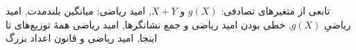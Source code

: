 \documentclass[a4paper,11pt,oneside,openany]{book}
\begin{document}
  {{تابعی از متغیرهای تصادفی: $g(X)$ و $X+Y$},
   {امید ریاضی: میانگین بلندمدت},
   {امید ریاضیِ $g(X)$},
   {خطی بودن امید ریاضی و جمع نشانگرها},
   {امید ریاضی همهٔ توزیع‌های تا اینجا},
   {امید ریاضی و قانون اعداد بزرگ}}

\mainmatter
\setcounter{chapter}{8}   %

\end{document}
